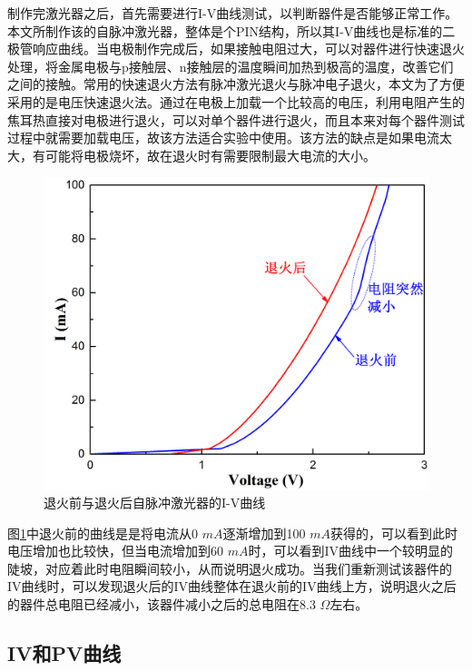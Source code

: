 制作完激光器之后，首先需要进行I-V曲线测试，以判断器件是否能够正常工作。本文所制作该的自脉冲激光器，整体是个PIN结构，所以其I-V曲线也是标准的二极管响应曲线。当电极制作完成后，如果接触电阻过大，可以对器件进行快速退火处理，将金属电极与p接触层、n接触层的温度瞬间加热到极高的温度，改善它们之间的接触。常用的快速退火方法有脉冲激光退火与脉冲电子退火，本文为了方便采用的是电压快速退火法。通过在电极上加载一个比较高的电压，利用电阻产生的焦耳热直接对电极进行退火，可以对单个器件进行退火，而且本来对每个器件测试过程中就需要加载电压，故该方法适合实验中使用。该方法的缺点是如果电流太大，有可能将电极烧坏，故在退火时有需要限制最大电流的大小。

\begin{figure}[htb]
	\centering
	\includegraphics[width=12cm]{./Pictures/laser_annealing.jpg}
	\captionsetup{justification=centering}
	\caption{退火前与退火后自脉冲激光器的I-V曲线}
	\label{laser_annealing}
\end{figure}

图\ref{laser_annealing}中退火前的曲线是是将电流从0 $mA$逐渐增加到100 $mA$获得的，可以看到此时电压增加也比较快，但当电流增加到60 $mA$时，可以看到IV曲线中一个较明显的陡坡，对应着此时电阻瞬间较小，从而说明退火成功。当我们重新测试该器件的IV曲线时，可以发现退火后的IV曲线整体在退火前的IV曲线上方，说明退火之后的器件总电阻已经减小，该器件减小之后的总电阻在8.3 $\Omega$左右。 

\subsection{IV和PV曲线}

